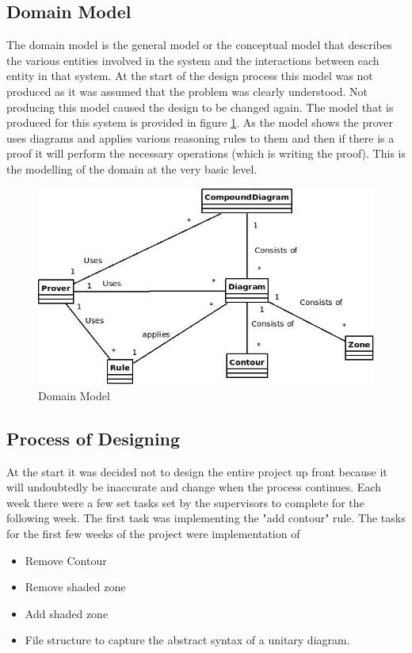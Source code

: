\documentclass[10pt, a4paper, titlepage]{article}
\begin{document}
\subsection{Domain Model}
The domain model is the general model or the conceptual model that describes the various entities involved in the system and the interactions between each entity in that system. At the start of the design process this model was not produced as it was assumed that the problem was clearly understood. Not producing this model caused the design to be changed again. The model that is produced for this system is provided in figure \ref{model}. As the model shows the prover uses diagrams and applies various reasoning rules to them and then if there is a proof it will perform the necessary operations (which is writing the proof). This is the modelling of the domain at the very basic level.

\begin{figure}[h]
\centering
\includegraphics[scale=0.7]{images/domainModel.jpeg}
\caption{Domain Model}
\label{model}
\end{figure}


\subsection{Process of Designing}
At the start it was decided not to design the entire project up front because it will undoubtedly be inaccurate and change when the process continues. Each week there were a few set tasks set by the supervisors to complete for the following week. The first task was implementing the "add contour" rule. The tasks for the first few weeks of the project were implementation of
\begin{itemize}
\item Remove Contour
\item Remove shaded zone
\item Add shaded zone
\item File structure to capture the abstract syntax of a unitary diagram.
\end{itemize}
\end{document}
